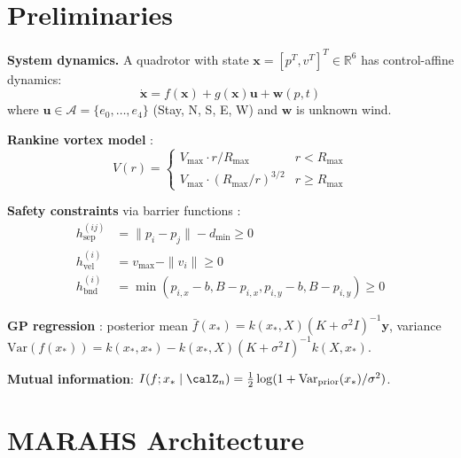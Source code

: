 \documentclass[11pt,twocolumn]{article}
\theoremstyle{definition}
\newcommand{\R}{\mathbb{R}}
\newcommand{\cA}{\mathcal{A}}
\newcommand{\vect}[1]{\mathbf{#1}}
\begin{document}
\section{Preliminaries}
\label{sec:preliminaries}

\textbf{System dynamics.} A quadrotor with state $\vect{x} = [p^T, v^T]^T \in \R^6$ has control-affine dynamics:
\begin{equation}
\dot{\vect{x}} = f(\vect{x}) + g(\vect{x})\vect{u} + \vect{w}(p,t)
\end{equation}
where $\vect{u} \in \cA = \{e_0, \ldots, e_4\}$ (Stay, N, S, E, W) and $\vect{w}$ is unknown wind.

\textbf{Rankine vortex model} \citep{Holland2010}:
\begin{equation}
V(r) = \begin{cases}
V_{\max} \cdot r / R_{\max} & r < R_{\max} \\
V_{\max} \cdot (R_{\max}/r)^{3/2} & r \geq R_{\max}
\end{cases}
\end{equation}

\textbf{Safety constraints} via barrier functions \citep{Ames2014}:
\begin{align}
h_{\text{sep}}^{(ij)} &= \|p_i - p_j\| - d_{\min} \geq 0 \\
h_{\text{vel}}^{(i)} &= v_{\max} - \|v_i\| \geq 0 \\
h_{\text{bnd}}^{(i)} &= \min(p_{i,x} - b, B - p_{i,x}, p_{i,y} - b, B - p_{i,y}) \geq 0
\end{align}

\textbf{GP regression} \citep{Rasmussen2006}: posterior mean $\bar{f}(x_*) = k(x_*, X)(K + \sigma^2 I)^{-1} \vect{y}$, variance $\text{Var}(f(x_*)) = k(x_*, x_*) - k(x_*, X)(K + \sigma^2 I)^{-1}k(X, x_*)$.

\textbf{Mutual information}: $I(f; x_* \mid \calZ_n) = \frac{1}{2}\log(1 + \text{Var}_{\text{prior}}(x_*)/\sigma^2)$.

\section{MARAHS Architecture}
\label{sec:methodology}
\end{document}
